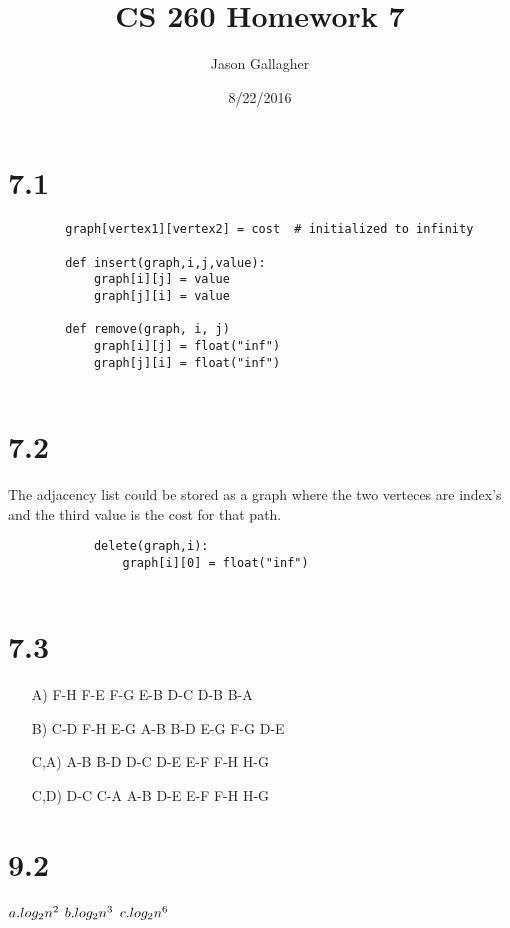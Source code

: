 \documentclass{article}
\begin{document}
		\title{CS 260 Homework 7}
		\date{8/22/2016}
		\author{Jason Gallagher}
		\maketitle
		
		\section{7.1}
		\begin{lstlisting}
		graph[vertex1][vertex2] = cost	# initialized to infinity
		
		def insert(graph,i,j,value):
			graph[i][j] = value
			graph[j][i] = value
		
		def remove(graph, i, j)
			graph[i][j] = float("inf")
			graph[j][i] = float("inf")
			
		\end{lstlisting}
		\section{7.2}
		
		The adjacency list could be stored as a graph where the two verteces are index's and the third value is the cost for that path.
		
		\begin{lstlisting}
			delete(graph,i):
				graph[i][0] = float("inf")
			
		\end{lstlisting}	
		\section{7.3}
			\begin{enumerate}
				\item[A)] F-H F-E F-G E-B D-C D-B B-A
				\item[B)] C-D F-H E-G A-B B-D E-G F-G D-E
				\item[C,A)] A-B B-D D-C D-E E-F F-H H-G
				\item[C,D)] D-C C-A A-B D-E E-F F-H H-G
			\end{enumerate}
			
			\section{9.2}
				\begin{math}
a. log_2n^2\\					
				\end{math}	
				\begin{math}
					b. log_2n^3\\
				\end{math}
				\begin{math}
					c. log_2n^6\\
				\end{math}
				
				
				
				
\end{document}
